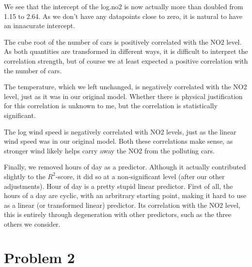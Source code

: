 \documentclass[a4paper, twocolumn]{article}
\begin{document}
We see that the intercept of the log.no2 is now actually more than doubled from 1.15 to 2.64. As we don't have any datapoints close to zero, it is natural to have an innacurate intercept.

The cube root of the number of cars is positively correlated with the NO2 level. As both quantities are transformed in different ways, it is difficult to interpret the correlation strength, but of course we at least expected a positive correlation with the number of cars. 

The temperature, which we left unchanged, is negatively correlated with the NO2 level, just as it was in our original model. Whether there is physical justification for this correlation is unknown to me, but the correlation is statistically significant.

The log wind speed is negatively correlated with NO2 levels, just as the linear wind speed was in our original model. Both these correlations make sense, as stronger wind likely helps carry away the NO2 from the polluting cars.

Finally, we removed hours of day as a predictor. Although it actually contributed slightly to the $R^2$-score, it did so at a non-significant level (after our other adjustments). Hour of day is a pretty stupid linear predictor. First of all, the hours of a day are cyclic, with an arbritrary starting point, making it hard to use as a linear (or transformed linear) predictor. Its correlation with the NO2 level, this is entirely through degeneration with other predictors, such as the three others we consider.

\section*{Problem 2}
\end{document}

